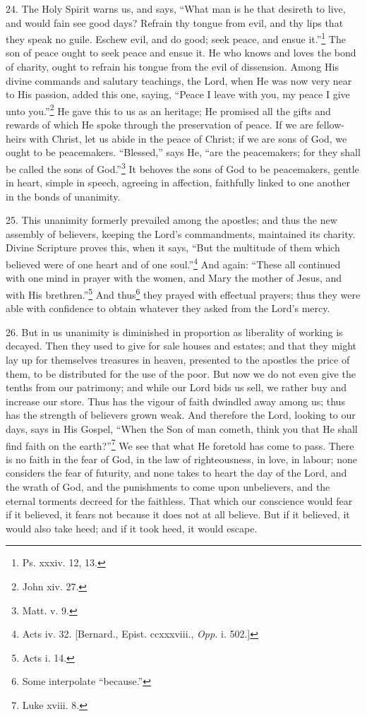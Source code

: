 24. The Holy Spirit warns us, and says, “What man is he that desireth to live, and would fain see good days? Refrain thy tongue from evil, and thy lips that they speak no guile. Eschew evil, and do good; seek peace, and ensue it.”\footnote{Ps. xxxiv. 12, 13.} The son of peace ought to seek peace and ensue it. He who knows and loves the bond of charity, ought to refrain his tongue from the evil of dissension. Among His divine commands and salutary teachings, the Lord, when He was now very near to His passion, added this one, saying, “Peace I leave with you, my peace I give unto you.”\footnote{John xiv. 27.} He gave this to us as an heritage; He promised all the gifts and rewards of which He spoke through the preservation of peace. If we are fellow-heirs with Christ, let us abide in the peace of Christ; if we are sons of God, we ought to be peacemakers. “Blessed,” says He, “are the peacemakers; for they shall be called the sons of God.”\footnote{Matt. v. 9.} It behoves the sons of God to be peacemakers, gentle in heart, simple in speech, agreeing in affection, faithfully linked to one another in the bonds of unanimity.

25. This unanimity formerly prevailed among the apostles; and thus the new assembly of believers, keeping the Lord’s commandments, maintained its charity. Divine Scripture proves this, when it says, “But the multitude of them which believed were of one heart and of one soul.”\footnote{Acts iv. 32. [Bernard., Epist. ccxxxviii., \emph{Opp.} i. 502.]} And again: “These all continued with one mind in prayer with the women, and Mary the mother of Jesus, and with His brethren.”\footnote{Acts i. 14.} And thus\footnote{Some interpolate “because.”} they prayed with effectual prayers; thus they were able with confidence to obtain whatever they asked from the Lord’s mercy.

26. But in us unanimity is diminished in proportion as liberality of working is decayed. Then they used to give for sale houses and estates; and that they might lay up for themselves treasures in heaven, presented to the apostles the price of them, to be distributed for the use of the poor. But now we do not even give the tenths from our patrimony; and while our Lord bids us sell, we rather buy and increase our store. Thus has the vigour of faith dwindled away among us; thus has the strength of believers grown weak. And therefore the Lord, looking to our days, says in His Gospel, “When the Son of man cometh, think you that He shall find faith on the earth?”\footnote{Luke xviii. 8.} We see that what He foretold has come to pass. There is no faith in the fear of God, in the law of righteousness, in love, in labour; none considers the fear of futurity, and none takes to heart the day of the Lord, and the wrath of God, and the punishments to come upon unbelievers, and the eternal torments decreed for the faithless. That which our conscience would fear if it believed, it fears not because it does not at all believe. But if it believed, it would also take heed; and if it took heed, it would escape.

